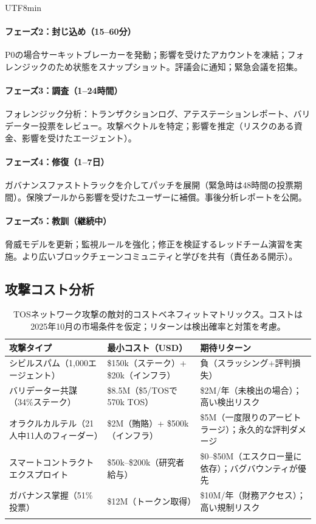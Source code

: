 \documentclass[11pt]{article}
\begin{document}
\begin{CJK}{UTF8}{min}
\begin{itemize}[noitemsep]
\paragraph{フェーズ2：封じ込め（15--60分）}
P0の場合サーキットブレーカーを発動；影響を受けたアカウントを凍結；フォレンジックのため状態をスナップショット。評議会に通知；緊急会議を招集。

\paragraph{フェーズ3：調査（1--24時間）}
フォレンジック分析：トランザクションログ、アテステーションレポート、バリデーター投票をレビュー。攻撃ベクトルを特定；影響を推定（リスクのある資金、影響を受けたエージェント）。

\paragraph{フェーズ4：修復（1--7日）}
ガバナンスファストトラックを介してパッチを展開（緊急時は48時間の投票期間）。保険プールから影響を受けたユーザーに補償。事後分析レポートを公開。

\paragraph{フェーズ5：教訓（継続中）}
脅威モデルを更新；監視ルールを強化；修正を検証するレッドチーム演習を実施。より広いブロックチェーンコミュニティと学びを共有（責任ある開示）。

\subsection{攻撃コスト分析}

\begin{longtable}{@{}p{}p{}p{}@{}}
\toprule
\textbf{攻撃タイプ} & \textbf{最小コスト（USD）} & \textbf{期待リターン} \\\midrule
シビルスパム（1,000エージェント） & \$150k（ステーク）+ \$20k（インフラ） & 負（スラッシング+評判損失） \\
バリデーター共謀（34\%ステーク） & \$8.5M（\$5/TOSで570k TOS） & \$2M/年（未検出の場合）；高い検出リスク \\
オラクルカルテル（21人中11人のフィーダー） & \$2M（賄賂）+ \$500k（インフラ） & \$5M（一度限りのアービトラージ）；永久的な評判ダメージ \\
スマートコントラクトエクスプロイト & \$50k--\$200k（研究者給与） & \$0--\$50M（エスクロー量に依存）；バグバウンティが優先 \\
ガバナンス掌握（51\%投票） & \$12M（トークン取得） & \$10M/年（財務アクセス）；高い規制リスク \\
\bottomrule
\caption{TOSネットワーク攻撃の敵対的コストベネフィットマトリックス。コストは2025年10月の市場条件を仮定；リターンは検出確率と対策を考慮。}
\end{longtable}


\end{itemize}
\end{CJK}
\end{document}
